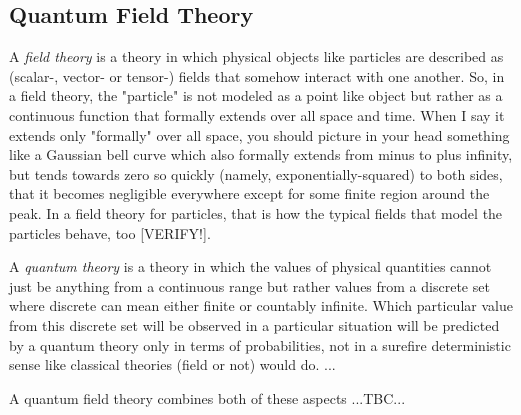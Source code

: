 \subsection{Quantum Field Theory}

A \emph{field theory} is a theory in which physical objects like particles are described as (scalar-, vector- or tensor-) fields that somehow interact with one another. So, in a field theory, the "particle" is not modeled as a point like object but rather as a continuous function that formally extends over all space and time. When I say it extends only "formally" over all space, you should picture in your head something like a Gaussian bell curve which also formally extends from minus to plus infinity, but tends towards zero so quickly (namely, exponentially-squared) to both sides, that it becomes negligible everywhere except for some finite region around the peak. In a field theory for particles, that is how the typical fields that model the particles behave, too [VERIFY!].

\medskip
A \emph{quantum theory} is a theory in which the values of physical quantities cannot just be anything from a continuous range but rather values from a discrete set where discrete can mean either finite or countably infinite. Which particular value from this discrete set will be observed in a particular situation will be predicted by a quantum theory only in terms of probabilities, not in a surefire deterministic sense like classical theories (field or not) would do. ...

\medskip
A quantum field theory combines both of these aspects ...TBC...


